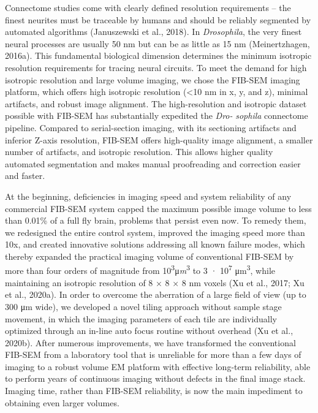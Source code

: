 \documentclass{article}
\begin{document}
Connectome studies come with clearly defined resolution requirements – the finest neurites must be traceable by humans and should be reliably segmented by automated algorithms (Januszewski et al., 2018). In \emph{Drosophila}, the very finest neural processes are usually 50 nm but can be as little as 15 nm (Meinertzhagen, 2016a). This fundamental biological dimension determines the minimum isotropic resolution requirements for tracing neural circuits. To meet the demand for high isotropic resolution and large volume imaging, we chose the FIB-SEM imaging platform, which offers high isotropic resolution (<10 nm in x, y, and z), minimal artifacts, and robust image alignment. The high-resolution and isotropic dataset possible with FIB-SEM has substantially expedited the \emph{Dro-} \emph{sophila} connectome pipeline. Compared to serial-section imaging, with its sectioning artifacts and inferior Z-axis resolution, FIB-SEM offers high-quality image alignment, a smaller number of artifacts, and isotropic resolution. This allows higher quality automated segmentation and makes manual proofreading and correction easier and faster.

At the beginning, deficiencies in imaging speed and system reliability of any commercial FIB-SEM system capped the maximum possible image volume to less than 0.01\% of a full fly brain, problems that persist even now. To remedy them, we redesigned the entire control system, improved the imaging speed more than 10x, and created innovative solutions addressing all known failure modes, which thereby expanded the practical imaging volume of conventional FIB-SEM by more than four orders of magnitude from 10\textsuperscript{3}μ\emph{m}\textsuperscript{3} to 3 · 10\textsuperscript{7} μm\textsuperscript{3}, while maintaining an isotropic resolution of 8 × 8 × 8 nm voxels (Xu et al., 2017; Xu et al., 2020a). In order to overcome the aberration of a large field of view (up to 300 μm wide), we developed a novel tiling approach without sample stage movement, in which the imaging parameters of each tile are individually optimized through an in-line auto focus routine without overhead (Xu et al., 2020b). After numerous improvements, we have transformed the conventional FIB-SEM from a laboratory tool that is unreliable for more than a few days of imaging to a robust volume EM platform with effective long-term reliability, able to perform years of continuous imaging without defects in the final image stack. Imaging time, rather than FIB-SEM reliability, is now the main impediment to obtaining even larger volumes.
\end{document}
